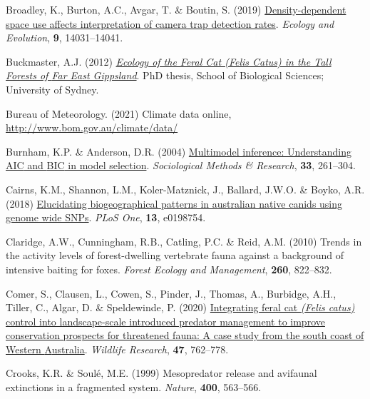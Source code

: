 \documentclass[preprint, 3p, authoryear]{elsarticle} %
\newlength{\cslhangindent}
\newlength{\cslentryspacingunit} %
\newenvironment{CSLReferences}[2] %
 {%
  \setlength{\parindent}{0pt}
  \ifodd #1
  \let\oldpar\par
  \def\par{\hangindent=\cslhangindent\oldpar}
  \fi
  \setlength{\parskip}{#2\cslentryspacingunit}
 }%
 {}
\begin{document}
\begin{CSLReferences}{1}{0}
\leavevmode{}%
Broadley, K., Burton, A.C., Avgar, T. \& Boutin, S. (2019) \href{https://doi.org/10.1002/ece3.5840}{Density-dependent space use affects interpretation of camera trap detection rates}. \emph{Ecology and Evolution}, \textbf{9}, 14031--14041.

\leavevmode{}%
Buckmaster, A.J. (2012) \emph{\href{http://hdl.handle.net/2123/8123}{Ecology of the Feral Cat (Felis Catus) in the Tall Forests of {Far East Gippsland}}}. PhD thesis, School of Biological Sciences; University of Sydney.

\leavevmode{}%
Bureau of Meteorology. (2021) Climate data online, \url{http://www.bom.gov.au/climate/data/}

\leavevmode{}%
Burnham, K.P. \& Anderson, D.R. (2004) \href{https://doi.org/10.1177/0049124104268644}{Multimodel inference: Understanding {AIC} and {BIC} in model selection}. \emph{Sociological Methods \& Research}, \textbf{33}, 261--304.

\leavevmode{}%
Cairns, K.M., Shannon, L.M., Koler-Matznick, J., Ballard, J.W.O. \& Boyko, A.R. (2018) \href{https://doi.org/10.1371/journal.pone.0198754}{Elucidating biogeographical patterns in australian native canids using genome wide SNPs}. \emph{PLoS One}, \textbf{13}, e0198754.

\leavevmode{}%
Claridge, A.W., Cunningham, R.B., Catling, P.C. \& Reid, A.M. (2010) Trends in the activity levels of forest-dwelling vertebrate fauna against a background of intensive baiting for foxes. \emph{Forest Ecology and Management}, \textbf{260}, 822--832.

\leavevmode{}%
Comer, S., Clausen, L., Cowen, S., Pinder, J., Thomas, A., Burbidge, A.H., Tiller, C., Algar, D. \& Speldewinde, P. (2020) \href{https://doi.org/10.1071/WR19217}{Integrating feral cat \emph{({Felis catus})} control into landscape-scale introduced predator management to improve conservation prospects for threatened fauna: A case study from the south coast of {Western {A}ustralia}}. \emph{Wildlife Research}, \textbf{47}, 762--778.

\leavevmode{}%
Crooks, K.R. \& Soulé, M.E. (1999) Mesopredator release and avifaunal extinctions in a fragmented system. \emph{Nature}, \textbf{400}, 563--566.


\end{CSLReferences}
\end{document}

